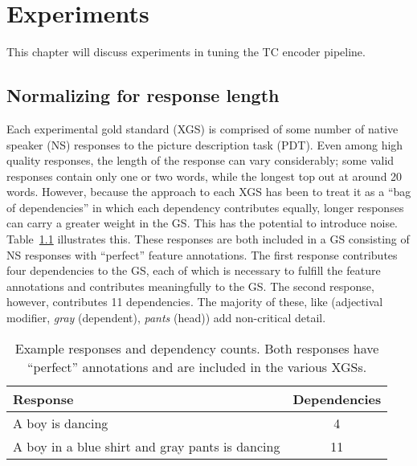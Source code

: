 \chapter{Experiments}
This chapter will discuss experiments in tuning the TC encoder pipeline.

\section{Normalizing for response length}
\label{section:experiment-normalizing-length}

Each experimental gold standard (XGS) is comprised of some number of native speaker (NS) responses to the picture description task (PDT). Even among high quality responses, the length of the response can vary considerably; some valid responses contain only one or two words, while the longest top out at around 20 words. However, because the approach to each XGS has been to treat it as a ``bag of dependencies'' in which each dependency contributes equally, longer responses can carry a greater weight in the GS. This has the potential to introduce noise. Table~\ref{tab:normalize-responses-ex} illustrates this. These responses are both included in a GS consisting of NS responses with ``perfect'' feature annotations. The first response contributes four dependencies to the GS, each of which is necessary to fulfill the feature annotations and contributes meaningfully to the GS. The second response, however, contributes 11 dependencies. The majority of these, like (adjectival modifier, \textit{gray} (dependent), \textit{pants} (head)) add non-critical detail.

\begin{table}[htb!]
\begin{center}
\begin{tabular}{|l|c|}
\hline
 Response & Dependencies \\
\hline
A boy is dancing & 4 \\
\hline
A boy in a blue shirt and gray pants is dancing & 11 \\
\hline
\end{tabular}
\caption{\label{tab:normalize-responses-ex} Example responses and dependency counts. Both responses have ``perfect'' annotations and are included in the various XGSs.}
\end{center}
\end{table}

